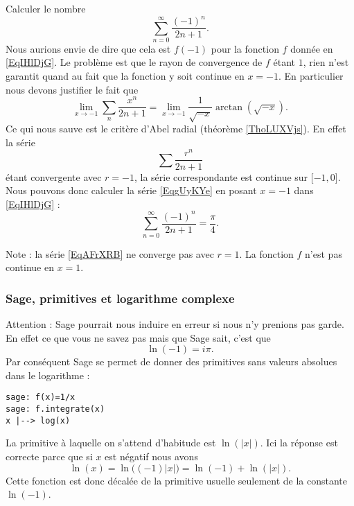 \begin{example}
    Calculer le nombre
    \begin{equation}        \label{EqgUyKYe}
        \sum_{n=0}^{\infty}\frac{ (-1)^n }{ 2n+1 }.
    \end{equation}
    Nous aurions envie de dire que cela est \( f(-1)\) pour la fonction \( f\) donnée en \eqref{EqIHlDjG}. Le problème est que le rayon de convergence de \( f\) étant \( 1\), rien n'est garantit quand au fait que la fonction y soit continue en \( x=-1\). En particulier nous devons justifier le fait que
    \begin{equation}
        \lim_{x\to -1} \sum_n\frac{ x^n }{ 2n+1 }=\lim_{x\to -1} \frac{1}{ \sqrt{-x} }\arctan(\sqrt{-x}).
    \end{equation}
    Ce qui nous sauve est le critère d'Abel radial (théorème \ref{ThoLUXVjs}). En effet la série
    \begin{equation}        \label{EqAFrXRB}
        \sum\frac{ r^n }{ 2n+1 }
    \end{equation}
    étant convergente avec \( r=-1\), la série correspondante est continue sur \( \mathopen[ -1 , 0 \mathclose]\). Nous pouvons donc calculer la série \eqref{EqgUyKYe} en posant \( x=-1\) dans \eqref{EqIHlDjG} :
    \begin{equation}       
        \sum_{n=0}^{\infty}\frac{ (-1)^n }{ 2n+1 }=\frac{ \pi }{ 4 }.
    \end{equation}

    Note : la série \eqref{EqAFrXRB} ne converge pas avec \( r=1\). La fonction \( f\) n'est pas continue en \( x=1\).
\end{example}

\subsubsection{Sage, primitives et logarithme complexe}
\label{PgpXBuBh}

Attention : Sage pourrait nous induire en erreur si nous n'y prenions pas garde. En effet ce que vous ne savez pas mais que Sage sait, c'est que
\begin{equation}
    \ln(-1)=i\pi.
\end{equation}
Par conséquent Sage se permet de donner des primitives sans valeurs absolues dans le logarithme :
\begin{verbatim}
sage: f(x)=1/x
sage: f.integrate(x)
x |--> log(x)
\end{verbatim}
La primitive à laquelle on s'attend d'habitude est \( \ln(| x |)\). Ici la réponse est correcte parce que si \( x\) est négatif nous avons
\begin{equation}
    \ln(x)=\ln\big( (-1)| x | \big)=\ln(-1)+\ln(| x |).
\end{equation}
Cette fonction est donc décalée de la primitive usuelle seulement de la constante \( \ln(-1)\).

